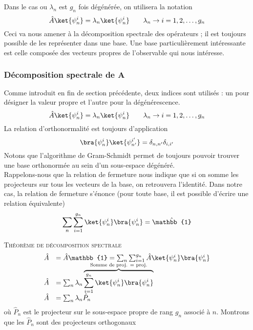 Dans le cas ou $\lambda_n$ est $g_n$ fois dégénérée, on utilisera la notation
\begin{equation}
\hat{A}\ket{\psi_n^i} = \lambda_n\ket{\psi_n^i}\qquad \lambda_n \rightarrow i=
1,2,\dots, g_n
\end{equation}
Ceci va nous amener à la décomposition spectrale des opérateurs ; il est 
toujours possible de les représenter dans une base. Une base particulièrement 
intéressante est celle composée des vecteurs propres de l'observable qui nous 
intéresse.

\subsubsection{Décomposition spectrale de A}
Comme introduit en fin de section précédente, deux indices sont utilisés : 
un pour désigner la valeur propre et l'autre pour la dégénérescence.
\begin{equation}
\hat{A}\ket{\psi_n^i} = \lambda_n\ket{\psi_n^i}\qquad \lambda_n \rightarrow i=
1,2,\dots, g_n
\end{equation}
La relation d'orthonormalité est toujours d'application
\begin{equation}
\bra{\psi_n^i}\ket{\psi_{n'}^{i'}} = \delta_{n,n'}\delta_{i,i'}
\end{equation}
Notons que l'algorithme de Gram-Schmidt permet de toujours pouvoir trouver une
base orthonormée au sein d'un sous-espace dégénéré.\\
Rappelons-nous que la relation de fermeture nous indique que si on somme les 
projecteurs sur tous les vecteurs de la base, on retrouvera l'identité. Dans 
notre cas, la relation de fermeture s'énonce (pour toute base, il 
est possible d'écrire une relation équivalente)
\begin{equation}
\sum_n\sum_{i=1}^{g_n} \ket{\psi_n^i}\bra{\psi_n^i} = \hat{\mathbb{1}}
\end{equation}

\textsc{Théorème de décomposition spectrale}\\
\begin{equation}
\begin{array}{ll}
\hat{A} &= \hat{A}\mathbb{1} = \sum_n\sum_{i=1}^{g_n} \hat{A}\ket{\psi_n^i
}\bra{\psi_n^i}\\
\hat{A} &= \sum_n \lambda_n \overbrace{\sum_{i=1}^{g_n} \ket{\psi_n^i}\bra{
\psi_n^i}}^{\text{Somme de proj. = proj.}}\\
\hat{A} &= \sum_n \lambda_n \hat{P}_n
\end{array}
\end{equation}
où $\hat{P}_n$ est le projecteur sur le sous-espace propre de rang $g_n$ associé à $n$.
 Montrons que les $\hat{P}_n$ sont des projecteurs orthogonaux

